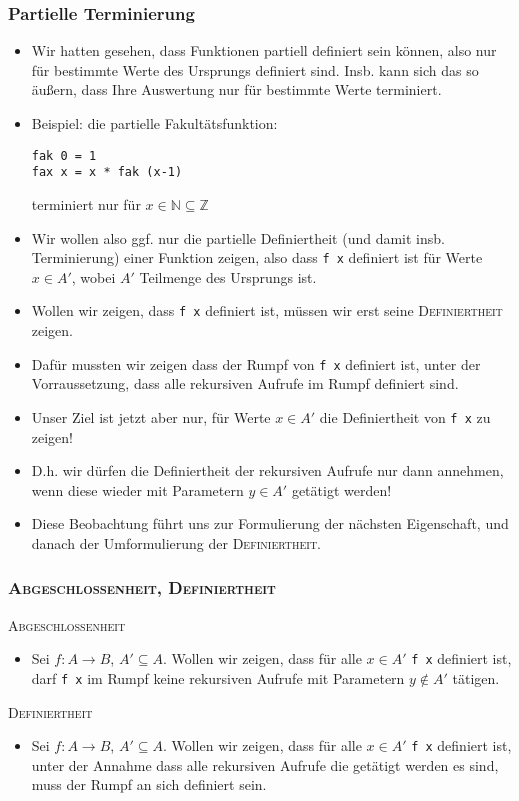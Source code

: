 \documentclass{beamer}
\begin{document}
\begin{frame}[fragile]
  \frametitle{Partielle Terminierung}
  \begin{itemize}
  \item Wir hatten gesehen, dass Funktionen partiell definiert sein können, also nur für bestimmte Werte des Ursprungs definiert sind. Insb. kann sich das so äußern, dass Ihre Auswertung nur für bestimmte Werte terminiert.
  \item Beispiel: die partielle Fakultätsfunktion:
\begin{Verbatim}
fak 0 = 1
fax x = x * fak (x-1)
\end{Verbatim}
    terminiert nur für \(x\in \mathbb{N}\subseteq \mathbb{Z}\)
  \item Wir wollen also ggf. nur die partielle Definiertheit (und damit insb. Terminierung) einer Funktion zeigen, also dass \texttt{f x} definiert ist für Werte \(x\in A'\), wobei \(A'\) Teilmenge des Ursprungs ist.
  \end{itemize}
\end{frame}
\begin{frame}
  \begin{itemize}
  \item Wollen wir zeigen, dass \texttt{f x} definiert ist, müssen wir erst seine \textsc{Definiertheit} zeigen.
  \item Dafür mussten wir zeigen dass der Rumpf von \texttt{f x} definiert ist, unter der Vorraussetzung, dass alle rekursiven Aufrufe im Rumpf definiert sind.
  \item Unser Ziel ist jetzt aber nur, für Werte  \(x\in A'\) die Definiertheit von \texttt{f x} zu zeigen!
  \item D.h. wir dürfen die Definiertheit der rekursiven Aufrufe nur dann annehmen, wenn diese wieder mit Parametern \(y\in A'\) getätigt werden!
  \item Diese Beobachtung führt uns zur Formulierung der nächsten Eigenschaft, und danach der Umformulierung der \textsc{Definiertheit}.
  \end{itemize}
\end{frame}
\begin{frame}
  \frametitle{\textsc{Abgeschlossenheit, Definiertheit}}
  \textsc{Abgeschlossenheit}
  \begin{itemize}
  \item Sei \(f:A\to B\), \(A'\subseteq A\). Wollen wir zeigen, dass für alle \(x\in A'\) \texttt{f x} definiert ist, darf \texttt{f x} im Rumpf keine rekursiven Aufrufe mit Parametern \(y\notin A'\) tätigen.
  \end{itemize}
  \textsc{Definiertheit}
  \begin{itemize}
  \item Sei \(f:A\to B\), \(A'\subseteq A\). Wollen wir zeigen, dass für alle \(x\in A'\) \texttt{f x} definiert ist, unter der Annahme dass alle rekursiven Aufrufe die getätigt werden es sind, muss der Rumpf an sich definiert sein.
  \end{itemize}
\end{frame}
\end{document}
